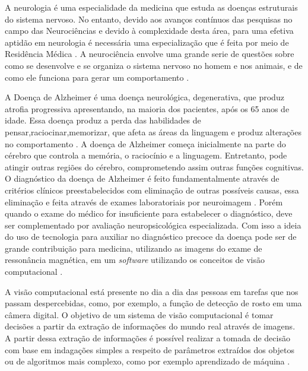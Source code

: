 \documentclass[openright]{UFRGS} %
\begin{document}
A neurologia é uma especialidade da medicina que estuda as doenças
estruturais do sistema nervoso. No entanto, devido aos avanços contínuos das
pesquisas no campo das Neurociências e devido à complexidade desta área, para uma efetiva aptidão em neurologia é necessária uma especialização que é feita por meio de Residência Médica \cite{reed2013neurologia}. A neurociência  envolve uma grande serie de questões sobre como se desenvolve e se organiza o sistema nervoso no homem e nos animais, e de como ele funciona para gerar um comportamento  \cite{purves2008neuroscience}.

A Doença de Alzheimer é uma doença neurológica, degenerativa, que produz atrofia progressiva apresentando, na maioria dos pacientes, após os 65 anos de idade. Essa doença produz a perda das habilidades de pensar,raciocinar,memorizar, que afeta as áreas da linguagem e produz alterações no comportamento \cite{alzheimer2003funccoes}. A doença de Alzheimer começa inicialmente na parte do cérebro que controla a memória, o raciocínio e a linguagem. Entretanto, pode atingir outras regiões do cérebro, comprometendo assim outras funções cognitivas. O diagnóstico da doença de Alzheimer é feito fundamentalmente através de critérios clínicos preestabelecidos com eliminação de outras possíveis causas, essa eliminação e feita através de exames
laboratoriais por neuroimagem \cite{nitrini2005diagnostico}. Porém quando o exame do médico for insuficiente para estabelecer o diagnóstico,
deve ser complementado por avaliação neuropsicológica
especializada. Com isso a ideia do uso de tecnologia para auxiliar no diagnóstico precoce da doença pode  ser de grande contribuição para medicina, utilizando as imagens do exame de ressonância magnética, em um
\textit{software} utilizando os conceitos de visão computacional \cite{aprahamian2009doencca}.

A visão computacional está presente no dia a dia das pessoas em tarefas que nos passam despercebidas, como, por exemplo, a função de detecção de rosto em uma câmera digital. O objetivo de um sistema de visão computacional é tomar decisões a partir da extração de informações do mundo real através de imagens. A partir dessa extração de informações é possível realizar a tomada de decisão com base em indagações simples a respeito de parâmetros extraídos dos objetos ou de algoritmos mais complexo, como por exemplo  aprendizado de máquina \cite{neves2012avanccos}.
\end{document}
